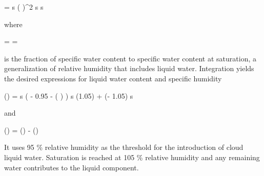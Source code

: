     \startformula
        \DERIV{\QLIQ}{\RHL} = \QSAT \startcases
             \MC s  \NR
            \NC \cos \left(   \right)^2
                 \le s  \NR
              \lt s \NR
        \stopcases
    \stopformula

    where

    \startformula
        \RHL = \frac{\QTOT}{\QSAT} = \frac{\QVAP + \QLIQ}{\QSAT}
    \stopformula

    is the fraction of specific water content to specific water content at
    saturation, a generalization of relative humidity that includes liquid
    water. Integration yields the desired expressions for liquid water content
    and specific humidity

    \placeformula
    \startformula
    \startalign[align={center,right}]
        \NC
        \QLIQ(\RHL) = \startcases[align={left,left,right}]
             \MC s  \NR
            \NC {} \left( \RHL - 0.95 - 
                \cos \left(  \right) \right)
                 \le s  \NR
            \NC \QLIQ(1.05) + \QSAT (\RHL - 1.05)  \lt s \NR
        \stopcases \NC \NR[eq:qliq]
    \stopalign
    \stopformula

    and

    \placeformula[eq:qvap]
    \startformula
        \QVAP(\RHL) = \QTOT(\RHL) - \QLIQ(\RHL) \EQSTOP
    \stopformula

    It uses 95 \% relative humidity as the threshold for the introduction of
    cloud liquid water. Saturation is reached at 105 \% relative humidity and
    any remaining water contributes to the liquid component.

